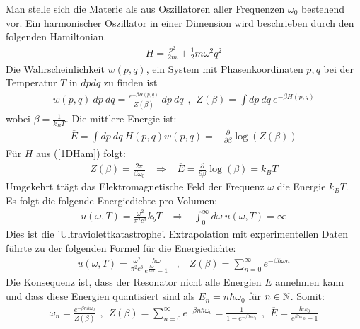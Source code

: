 Man stelle sich die Materie als aus Oszillatoren aller Frequenzen $\omega_0$
bestehend vor. Ein harmonischer Oszillator in einer Dimension wird beschrieben
durch den folgenden Hamiltonian.
\begin{align}\label{1DHam}
    H = \frac{p^2}{2m} + \frac{1}{2} m \omega^2 q^2
\end{align}
Die Wahrscheinlichkeit $w(p,q)$, ein System mit Phasenkoordinaten $p,q$ bei
der Temperatur $T$ in $dp dq$ zu finden ist
\begin{align*}
    w(p,q) \ dp \ dq = \frac{e^{- \beta H(p,q)}}{Z(\beta)} \ dp \ dq
    \hspace{5pt} , \hspace{5pt}
    Z(\beta) = \int dp \ dq \ e^{-\beta H(p,q)}
\end{align*}
wobei $\beta = \frac{1}{k_B T}$. Die mittlere Energie ist:
\begin{align*}
    \overline{E} = \int dp \ dq \ H(p,q) w(p,q)
    = - \frac{\partial}{\partial \beta} \log(Z(\beta))
\end{align*}
Für $H$ aus (\ref{1DHam}) folgt:
\begin{align*}
    Z(\beta) = \frac{2 \pi}{\beta \omega_0}
    \hspace{10pt} \Rightarrow \hspace{10pt}
    \overline{E} = \frac{\partial}{\partial \beta} \log(\beta) = k_B T
\end{align*}
Umgekehrt trägt das Elektromagnetische Feld der Frequenz $\omega$ die Energie
$k_B T$. Es folgt die folgende Energiedichte pro Volumen:
\begin{align*}
    u(\omega,T) = \frac{\omega^2}{\pi^2 c^3} k_b T
    \hspace{10pt} \Rightarrow \hspace{10pt}
    \int_0^\infty d \omega \ u(\omega,T) = \infty
\end{align*}
Dies ist die 'Ultraviolettkatastrophe'. Extrapolation mit experimentellen
Daten führte zu der folgenden Formel für die Energiedichte:
\begin{align*}
    u(\omega,T) = \frac{\omega^2}{\pi^2 c^3} \frac{\hbar \omega}{e^{\frac{\hbar \omega}{k_B T}} - 1}
    \hspace{10pt} , \hspace{10pt}
    Z(\beta) = \sum_{n=0}^\infty e^{- \beta \hbar \omega n}
\end{align*}
Die Konsequenz ist, dass der Resonator nicht alle Energien $E$ annehmen kann
und dass diese Energien quantisiert sind als $E_n = n \hbar \omega_0$ für
$n \in \mathbb{N}$. Somit:
\begin{align*}
    \omega_n = \frac{e^{- \beta n \hbar \omega_0}}{Z(\beta)}
    \hspace{5pt} , \hspace{5pt}
    Z(\beta) = \sum_{n=0}^\infty e^{- \beta n \hbar \omega_0}
    = \frac{1}{1 - e^{- \beta \hbar \omega_0}}
    \hspace{5pt} , \hspace{5pt}
    \overline{E} = \frac{\hbar \omega_0}{e^{\beta \hbar \omega_0} -1}
\end{align*}

